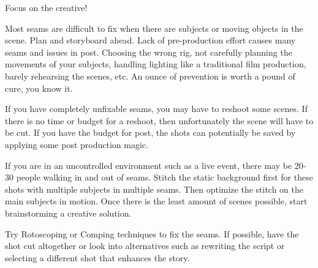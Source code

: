 \begin{fullwidth}

{\large Focus on the creative! \par}

Most seams are difficult to fix when there are subjects or moving objects in the scene. Plan and storyboard ahead. Lack of pre-production effort causes many seams and issues in post. Choosing the wrong rig, not carefully planning the movements of your subjects, handling lighting like a traditional film production, barely rehearsing the scenes, etc. An ounce of prevention is worth a pound of cure, you know it. 

If you have completely unfixable seams, you may have to reshoot some scenes. If there is no time or budget for a reshoot, then unfortunately the scene will have to be cut. If you have the budget for post, the shots can potentially be saved by applying some post production magic. 

If you are in an uncontrolled environment such as a live event, there may be 20-30 people walking in and out of seams. Stitch the static background first for these shots with multiple subjects in multiple seams. Then optimize the stitch on the main subjects in motion. Once there is the least amount of scenes possible, start brainstorming a creative solution. 




Try Rotoscoping or Comping techniques to fix the seams. If possible, have the shot cut altogether or look into alternatives such as rewriting the script or selecting a different shot that enhances the story.

\clearpage
\end{fullwidth}